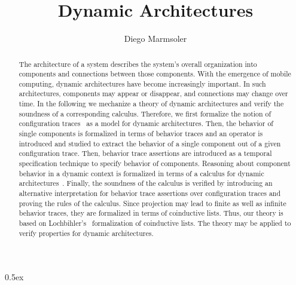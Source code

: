 \documentclass[11pt,a4paper]{article}
\begin{document}
\title{Dynamic Architectures}
\author{Diego Marmsoler}
\maketitle

\begin{abstract}
	The architecture of a system describes the system's overall organization into components and connections between those components.
	With the emergence of mobile computing, dynamic architectures have become increasingly important.
	In such architectures, components may appear or disappear, and connections may change over time.
	In the following we mechanize a theory of dynamic architectures and verify the soundness of a corresponding calculus.
	Therefore, we first formalize the notion of configuration traces~\cite{Marmsoler2016} as a model for dynamic architectures.
	Then, the behavior of single components is formalized in terms of behavior traces and an operator is introduced and studied to extract the behavior of a single component out of a given configuration trace.
	Then, behavior trace assertions are introduced as a temporal specification technique to specify behavior of components.
	Reasoning about component behavior in a dynamic context is formalized in terms of a calculus for dynamic architectures~\cite{Marmsoler2017c}.
	Finally, the soundness of the calculus is verified by introducing an alternative interpretation for behavior trace assertions over configuration traces and proving the rules of the calculus.
	Since projection may lead to finite as well as infinite behavior traces, they are formalized in terms of coinductive lists.
	Thus, our theory is based on Lochbihler's~\cite{Lochbihler2010} formalization of coinductive lists.
	The theory may be applied to verify properties for dynamic architectures.
\end{abstract}

\tableofcontents
\newpage

\parindent 0pt\parskip 0.5ex





\end{document}
